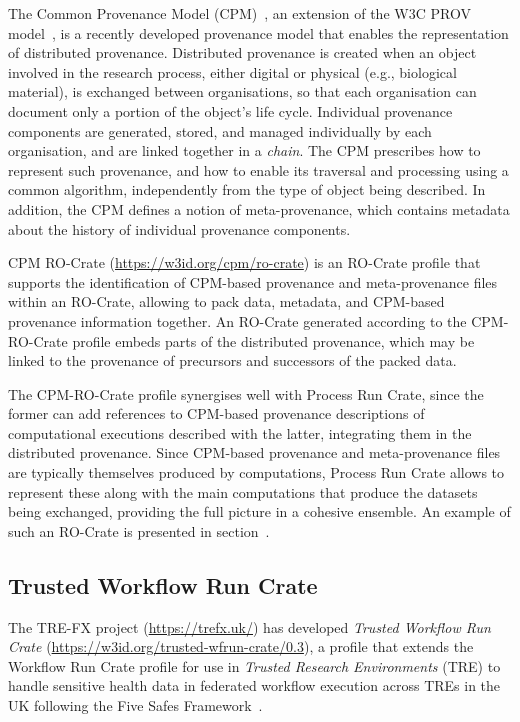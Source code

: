 \documentclass[10pt,letterpaper]{article}
\begin{document}
The Common Provenance Model (CPM)~\cite{Wittner 2022}, an extension of the W3C PROV model~\cite{Moreau 2013}, is a recently developed provenance model that enables the representation of distributed provenance.
Distributed provenance is created when an object involved in the research process, either digital or physical (e.g., biological material), is exchanged between organisations, so that each organisation can document only a portion of the object's life cycle.
Individual provenance components are generated, stored, and managed individually by each organisation, and are linked together in a \emph{chain}.
The CPM prescribes how to represent such provenance, and how to enable its traversal and processing using a common algorithm, independently from the type of object being described.
In addition, the CPM defines a notion of meta-provenance, which contains metadata about the history of individual provenance components.

CPM RO-Crate (\url{https://w3id.org/cpm/ro-crate}) is an RO-Crate profile that supports the identification of CPM-based provenance and meta-provenance files within an RO-Crate, allowing to pack data, metadata, and CPM-based provenance information together.
An RO-Crate generated according to the CPM-RO-Crate profile embeds parts of the distributed provenance, which may be linked to the provenance of precursors and successors of the packed data.

The CPM-RO-Crate profile synergises well with Process Run Crate, since the former can add references to CPM-based provenance descriptions of computational executions described with the latter, integrating them in the distributed provenance.
Since CPM-based provenance and meta-provenance files are typically themselves produced by computations, Process Run Crate allows to represent these along with the main computations that produce the datasets being exchanged, providing the full picture in a cohesive ensemble.
An example of such an RO-Crate is presented in section~\cite{Process Run Crate and CPM RO-Crate}.

\subsection{Trusted Workflow Run Crate}\label{trusted-workflow-run-crate}

The TRE-FX project (\url{https://trefx.uk/}) has developed \emph{Trusted Workflow Run Crate}
(\url{https://w3id.org/trusted-wfrun-crate/0.3}), a profile that extends the Workflow Run Crate profile for use in
\emph{Trusted Research Environments} (TRE) to handle sensitive health data in federated workflow execution across TREs in the UK following the Five Safes Framework~\cite{Desai et al 2016}.
\end{document}
